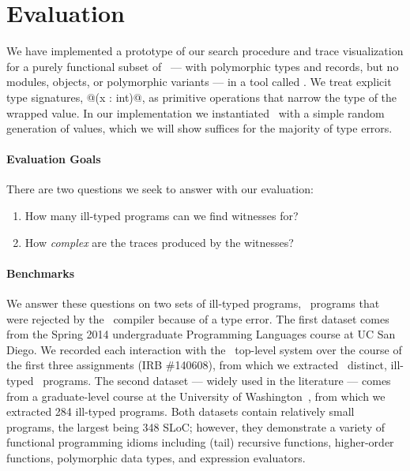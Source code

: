 \section{Evaluation}
\label{sec:evaluation}

We have implemented a prototype of our search procedure and trace
visualization for a purely functional subset of \ocaml\
--- with polymorphic types and records, but no modules, objects, or polymorphic variants ---
in a tool called \nanomaly.
%
We treat explicit type signatures, \eg @(x : int)@, as
primitive operations that narrow the type of the wrapped value.
%
In our implementation we instantiated \gensym\ with a simple random
generation of values, which we will show suffices for the majority of
type errors.

\paragraph{Evaluation Goals}
%
There are two questions we seek to answer with our evaluation:
%
\begin{enumerate}
\item {}
      How many ill-typed programs can we find witnesses for?
\item {}
      How \emph{complex} are the traces produced by the witnesses?
\end{enumerate}

\paragraph{Benchmarks}
We answer these questions on two sets of ill-typed programs, \ie\
programs that were rejected by the \ocaml\ compiler because of a
type error.
%
The first dataset comes from the Spring 2014 undergraduate Programming
Languages course at UC San Diego.
%
We recorded each interaction with the \ocaml\ top-level system over the
course of the first three assignments (IRB
\#140608),
from which we extracted \ucsdsize\ distinct, ill-typed \ocaml\ programs.
%
The second dataset --- widely used in the literature --- comes from a
graduate-level course at the University of Washington~\cite{Lerner2006-pj},
from which we extracted 284 ill-typed programs.
%
Both datasets contain relatively small programs, the largest being 348
SLoC; however, they demonstrate a variety of functional programming
idioms including (tail) recursive functions, higher-order functions,
polymorphic data types, and expression evaluators.


